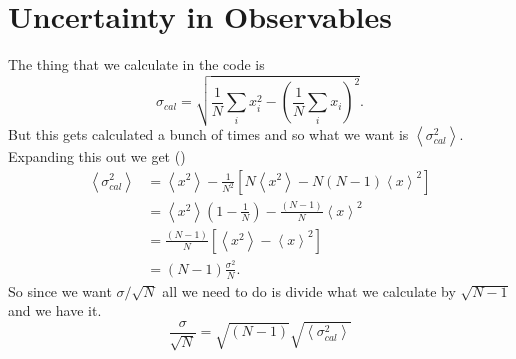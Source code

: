 \documentclass[12pt]{extarticle}
\newcommand{\red}[1]{{\color{red}{#1}}}
\begin{document}
\section*{Uncertainty in Observables}
The thing that we calculate in the code is
\begin{equation}
   \sigma_{cal} = \sqrt{\frac{1}{N}\sum\limits_ix_i^2-\left(\frac{1}{N}\sum\limits_ix_i\right)^2}.
\end{equation}
But this gets calculated a bunch of times and so what we want is $\left<\sigma_{cal}^2\right>$. Expanding this out we get (\red{As a reference I don't completerly understand how $\left<x_1x_2\right> is \left<x\right>^2$})
\begin{align}
   \left<\sigma_{cal}^2\right> &= \left<x^2\right> - \frac{1}{N^2}\left[N\left<x^2\right>-N(N-1)\left<x\right>^2\right] \\
   &= \left<x^2\right>\left(1-\frac{1}{N}\right) - \frac{(N-1)}{N}\left<x\right>^2 \\
   &= \frac{(N-1)}{N}\left[\left<x^2\right>-\left<x\right>^2\right] \\
   &= (N-1)\frac{\sigma^2}{N}.
\end{align}
So since we want $\sigma/\sqrt{N}$ all we need to do is divide what we calculate by $\sqrt{N-1}$ and we have it.
\begin{equation}
   \frac{\sigma}{\sqrt{N}} = \sqrt{(N-1)}\sqrt{\left<\sigma_{cal}^2\right>}
\end{equation}
\end{document}
